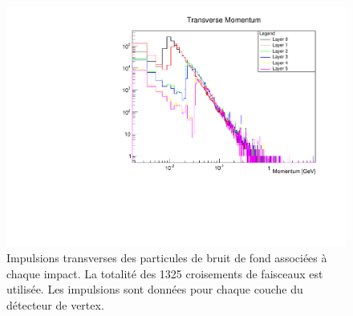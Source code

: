   \begin{figure}[!htb]
    \begin{center}
      \includegraphics[scale=0.50]{./figures/Beamstrahlung/Transverse_Momentum_AllLayers.pdf}
      \caption{Impulsions transverses des particules de bruit de fond associ\'ees \`a chaque impact. La totalit\'e des 1325 croisements de faisceaux est utilis\'ee. Les impulsions sont donn\'ees pour chaque couche du d\'etecteur de vertex.}
      \label{fig:transverseMomentum}
    \end{center}
  \end{figure} 
  
  
